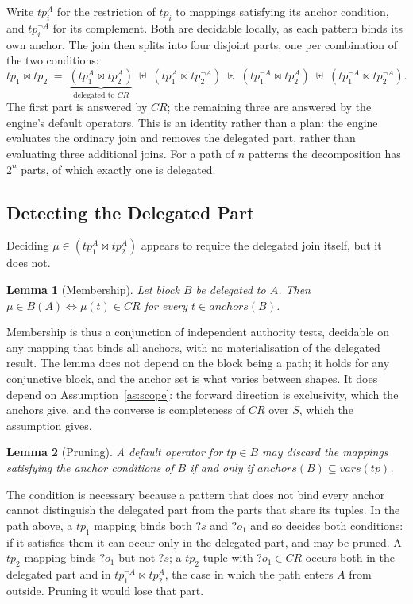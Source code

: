 \documentclass{article}
\newtheorem{lemma}{Lemma}
\begin{document}
Write $tp_i^{A}$ for the restriction of $tp_i$ to mappings satisfying its anchor
condition, and $tp_i^{\lnot A}$ for its complement. Both are decidable locally, as each
pattern binds its own anchor. The join then splits into four disjoint parts, one per
combination of the two conditions:
\[
tp_1 \bowtie tp_2 \;=\;
\underbrace{(tp_1^{A} \bowtie tp_2^{A})}_{\text{delegated to } CR}
\;\uplus\; (tp_1^{A} \bowtie tp_2^{\lnot A})
\;\uplus\; (tp_1^{\lnot A} \bowtie tp_2^{A})
\;\uplus\; (tp_1^{\lnot A} \bowtie tp_2^{\lnot A}).
\]
The first part is answered by $CR$; the remaining three are answered by the engine's
default operators. This is an identity rather than a plan: the engine evaluates the
ordinary join and removes the delegated part, rather than evaluating three additional
joins. For a path of $n$ patterns the decomposition has $2^n$ parts, of which exactly
one is delegated.

\subsection*{Detecting the Delegated Part}

Deciding $\mu \in (tp_1^{A} \bowtie tp_2^{A})$ appears to require the delegated join
itself, but it does not.

\begin{lemma}[Membership]
Let block $B$ be delegated to $A$. Then
$\mu \in B(A) \iff \mu(t) \in CR$ for every $t \in \mathit{anchors}(B)$.
\end{lemma}

Membership is thus a conjunction of independent authority tests, decidable on any
mapping that binds all anchors, with no materialisation of the delegated result. The
lemma does not depend on the block being a path; it holds for any conjunctive block, and
the anchor set is what varies between shapes. It does depend on
Assumption~\ref{as:scope}: the forward direction is exclusivity, which the anchors give,
and the converse is completeness of $CR$ over $S$, which the assumption gives.

\begin{lemma}[Pruning]
A default operator for $tp \in B$ may discard the mappings satisfying the anchor
conditions of $B$ if and only if $\mathit{anchors}(B) \subseteq \mathit{vars}(tp)$.
\end{lemma}

The condition is necessary because a pattern that does not bind every anchor cannot
distinguish the delegated part from the parts that share its tuples. In the path above,
a $tp_1$ mapping binds both $?s$ and $?o_1$ and so decides both conditions: if it
satisfies them it can occur only in the delegated part, and may be pruned. A $tp_2$
mapping binds $?o_1$ but not $?s$; a $tp_2$ tuple with $?o_1 \in CR$ occurs both in the
delegated part and in $tp_1^{\lnot A} \bowtie tp_2^{A}$, the case in which the path
enters $A$ from outside. Pruning it would lose that part.
\end{document}
